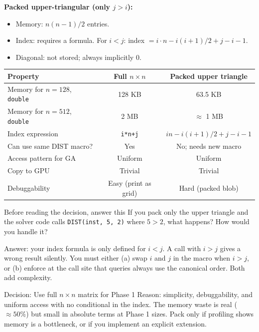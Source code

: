 \documentclass[11pt]{article}
\begin{document}
\textbf{Packed upper-triangular (only $j > i$):}
\begin{itemize}
  \item Memory: $n(n-1)/2$ entries.
  \item Index: requires a formula. For $i < j$: index $= i \cdot n - i(i+1)/2 + j - i - 1$.
  \item Diagonal: not stored; always implicitly 0.
\end{itemize}

\begin{center}
\renewcommand{\arraystretch}{1.5}
\begin{tabular}{lcc}
\toprule
Property & Full $n \times n$ & Packed upper triangle \\
\midrule
Memory for $n=128$, \texttt{double} & 128 KB & 63.5 KB \\
Memory for $n=512$, \texttt{double} & 2 MB & $\approx$ 1 MB \\
Index expression & \texttt{i*n+j} & $in - i(i+1)/2 + j - i - 1$ \\
Can use same DIST macro? & Yes & No; needs new macro \\
Access pattern for GA & Uniform & Uniform \\
Copy to GPU & Trivial & Trivial \\
Debuggability & Easy (print as grid) & Hard (packed blob) \\
\bottomrule
\end{tabular}
\end{center}

\begin{inquiry}{Before reading the decision, answer this}
If you pack only the upper triangle and the solver code calls \texttt{DIST(inst, 5, 2)} where $5 > 2$, what happens? How would you handle it?
\end{inquiry}

Answer: your index formula is only defined for $i < j$. A call with $i > j$ gives a wrong result silently. You must either (a) swap $i$ and $j$ in the macro when $i > j$, or (b) enforce at the call site that queries always use the canonical order. Both add complexity.

\begin{goodbox}{Decision: Use full $n \times n$ matrix for Phase 1}
Reason: simplicity, debuggability, and uniform access with no conditional in the index. The memory waste is real ($\approx 50\%$) but small in absolute terms at Phase 1 sizes. Pack only if profiling shows memory is a bottleneck, or if you implement an explicit extension.
\end{goodbox}
\end{document}
